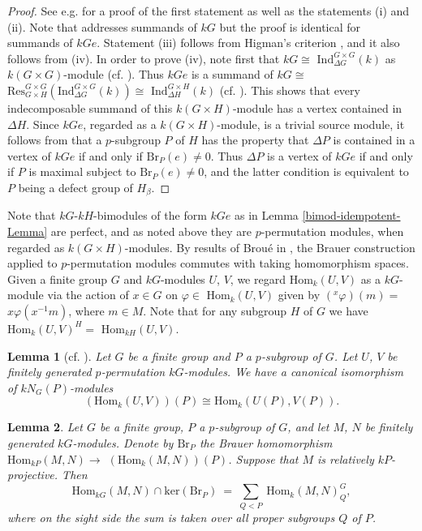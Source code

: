 \documentclass{amsart}
\theoremstyle{plain}\newtheorem{Theorem}{Theorem}[section]
\theoremstyle{plain}\newtheorem{Conjecture}[Theorem]{Conjecture}
\theoremstyle{plain}\newtheorem{Corollary}[Theorem]{Corollary}
\theoremstyle{plain}\newtheorem{Lemma}[Theorem]{Lemma}
\theoremstyle{plain}\newtheorem{Proposition}[Theorem]{Proposition}
\theoremstyle{definition}\newtheorem{Definition}[Theorem]{Definition}
\theoremstyle{definition}\newtheorem{Example}[Theorem]{Example}
\theoremstyle{definition}\newtheorem{Examples}[Theorem]{Examples}
\theoremstyle{definition}\newtheorem{Exercise}[Theorem]{Exercise}
\theoremstyle{definition}\newtheorem{Notation}[Theorem]{Notation}
\theoremstyle{definition}\newtheorem{Remark}[Theorem]{Remark}
\theoremstyle{definition}\newtheorem{Remarks}[Theorem]{Remarks}
\theoremstyle{plain}\newtheorem{Statement}[Theorem]{}
\def\Br{\mathrm{Br}}                 \def\ten{\otimes}
\def\Hom{\mathrm{Hom}}           \def\tenkS{\otimes_{kS}}
\def\ker{\mathrm{ker}}           \def\tenkT{\otimes_{kT}}
\def\Ind{\mathrm{Ind}}    \def\tenC{\otimes_C}
\def\Res{\mathrm{Res}}           \def\tenOR{\otimes_{\mathcal{O}R}}
\begin{document}
\begin{proof}
See  e.g. \cite[Lemma 5.12.7]{LiBookI} for a proof of the first statement as well
as the statements (i) and (ii).  Note that   \cite[Lemma 5.12.7]{LiBookI}   
addresses summands of $kG$   but the proof is identical for  summands of $kGe $.
Statement (iii) follows from Higman's criterion 
\cite[Theorem 2.6.2]{LiBookI}, and it also follows from (iv). In order to prove (iv), 
note first that $kG\cong$ $\Ind^{G\times G}_{\Delta G}(k)$ as $k(G\times G)$-module
(cf. \cite[Corollary 2.4.5]{LiBookI}).  Thus  $kGe$ is a summand of $kG\cong$ 
$\Res^{G\times G}_{G\times H}(\Ind^{G\times G}_{\Delta G}(k))\cong$
$\Ind_{\Delta H}^{G\times H}(k)$ (cf. \cite[Proposition 2.4.14]{LiBookI}).
This shows that every  indecomposable summand of this
$k(G\times H)$-module has a vertex contained in $\Delta H$.
Since $kGe$, regarded as a $k(G\times H)$-module,  is a trivial source module, 
it follows  from  \cite[Proposition 5.10.3]{LiBookI} that a $p$-subgroup $P$
of $H$ has the property that $\Delta P$ is contained in a vertex of $kGe$
if and only if $\Br_P(e)\neq 0$.  Thus $\Delta P$ is a vertex of $kGe$ if and
only if $P$ is maximal subject to $\Br_P(e)\neq 0$, and the latter condition
is equivalent to $P$ being a defect group of $H_\beta$.
\end{proof} 

Note that $kG$-$kH$-bimodules of the form $kGe$ as in Lemma 
\ref{bimod-idempotent-Lemma} are perfect, and as noted above they are 
$p$-permutation  modules, when regarded as  $k(G\times H)$-modules.
By results of Brou\'e in \cite{Broue85}, the Brauer construction applied to
$p$-permutation modules commutes with taking homomorphism spaces. 
Given a finite group $G$ and $kG$-modules $U$, $V$, we regard $\Hom_k(U,V)$
as a $kG$-module via the action of $x\in G$ on $\varphi\in$ $\Hom_k(U,V)$
given by ${(^x{\varphi})}(m)=$ $x\varphi(x^{-1}m)$, where $m\in M$.
Note that for any subgroup $H$ of $G$ we have $\Hom_k(U,V)^H=$
$\Hom_{kH}(U,V)$. 


\begin{Lemma}[{cf. \cite[(3.3)]{Broue85}}] \label{Brauer-p-permutation}
Let $G$ be a finite group and $P$ a $p$-subgroup of $G$.
Let $U$, $V$ be finitely generated $p$-permutation $kG$-modules.
We have a canonical isomorphism of $kN_G(P)$-modules 
$$(\Hom_k(U,V))(P)\cong \Hom_k(U(P), V(P)).$$
\end{Lemma} 

\begin{Lemma} \label{Hom-p-permutation}
Let $G$ be a finite group, $P$ a $p$-subgroup of $G$, and let $M$, $N$ be finitely 
generated $kG$-modules. Denote by $\Br_P$ the Brauer homomorphism
$\Hom_{kP}(M,N)\to$ $(\Hom_k(M,N))(P)$. Suppose that $M$ is relatively 
$kP$-projective. Then
$$\Hom_{kG}(M,N) \cap \ker(\Br_P)\ =\ \sum_{Q<P}\ \Hom_k(M,N)_Q^G,$$
where on the sight side the sum is taken over all proper subgroups $Q$ of $P$.
\end{Lemma}
\end{document}

